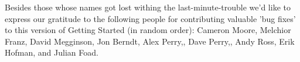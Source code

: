 Besides those whose names got lost withing the last-minute-trouble we'd like to express our
gratitude to the following people for contributing valuable 'bug fixes' to this version of Getting Started (in random order): Cameron Moore, Melchior Franz, David Megginson, Jon Berndt, Alex Perry,, Dave Perry,, Andy Ross, Erik Hofman, and Julian Foad. 

